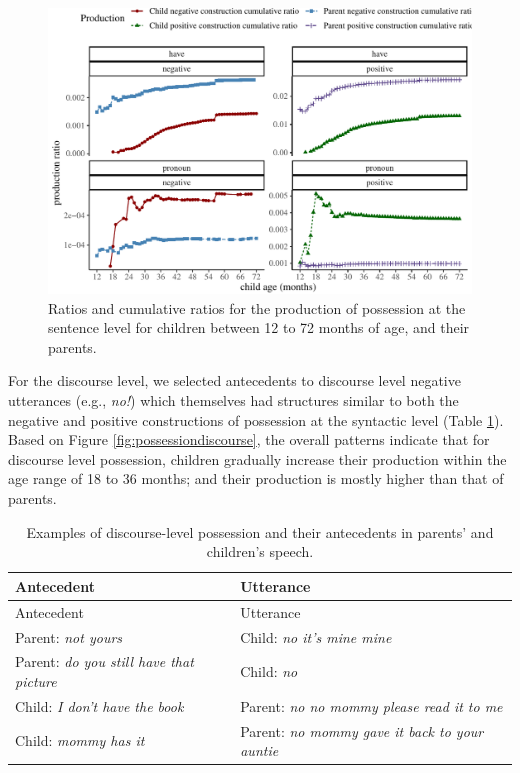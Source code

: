 \documentclass[
  english,
  man,floatsintext]{apa6}
\begin{document}
\begin{figure}[H]

{\centering \includegraphics{neg_construction_article_files/figure-latex/possession-1} 

}

\caption{Ratios and cumulative ratios for the production of possession at the sentence level for children between 12 to 72 months of age, and their parents.}\label{fig:possession}
\end{figure}

For the discourse level, we selected antecedents to discourse level negative utterances (e.g., \emph{no!}) which themselves had structures similar to both the negative and positive constructions of possession at the syntactic level (Table \ref{tab:dispossess}). Based on Figure \ref{fig:possessiondiscourse}, the overall patterns indicate that for discourse level possession, children gradually increase their production within the age range of 18 to 36 months; and their production is mostly higher than that of parents.

\begin{longtable}[]{@{}ll@{}}
\caption{\label{tab:dispossess} Examples of discourse-level possession and their antecedents in parents' and children's speech.}\tabularnewline
\toprule
Antecedent & Utterance \\
\midrule
\endfirsthead
\toprule
Antecedent & Utterance \\
\midrule
\endhead
Parent: \emph{not yours} & Child: \emph{no it's mine mine} \\
Parent: \emph{do you still have that picture} & Child: \emph{no} \\
Child: \emph{I don't have the book} & Parent: \emph{no no mommy please read it to me} \\
Child: \emph{mommy has it} & Parent: \emph{no mommy gave it back to your auntie} \\
\bottomrule
\end{longtable}
\end{document}
